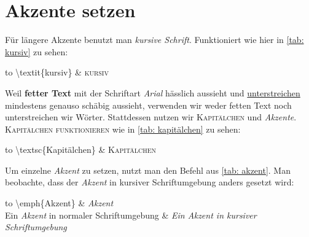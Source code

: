 \section{Akzente setzen}
Für längere Akzente benutzt man \textit{kursive Schrift}. Funktioniert wie hier in \ref{tab: kursiv} zu sehen:\\
\begin{table}[h]
\begin{tabu} to \textwidth {X[l]X[l]}
\toprule
\textbackslash textit\{kursiv\} & \textsc{kursiv} \\
\bottomrule
\end{tabu}
\caption{kursiv}
\label{tab: kursiv}
\end{table}
%
%
Weil \textbf{fetter Text} mit der Schriftart \emph{Arial} hässlich aussieht und \underline{unterstreichen} mindestens genauso schäbig aussieht, verwenden wir weder fetten Text noch unterstreichen wir Wörter. Stattdessen nutzen wir \textsc{Kapitälchen} und \emph{Akzente}. \textsc{Kapitälchen funktionieren} wie in \ref{tab: kapitälchen} zu sehen:\\
\begin{table}[h]
\begin{tabu} to \textwidth {X[l]X[l]}
\toprule
\textbackslash textsc\{Kapitälchen\} & \textsc{Kapitälchen} \\
\bottomrule
\end{tabu}
\caption{Kapitälchen}
\label{tab: kapitälchen}
\end{table}
%
%
Um einzelne \emph{Akzent} zu setzen, nutzt man den Befehl aus \ref{tab: akzent}. Man beobachte, dass der \emph{Akzent} in kursiver Schriftumgebung anders gesetzt wird:
\begin{table}[h]
\begin{tabu} to \textwidth {X[l]X[l]}
\toprule
\textbackslash emph\{Akzent\} & \emph{Akzent} \\
Ein \emph{Akzent} in normaler Schriftumgebung & \textit{Ein \emph{Akzent} in kursiver Schriftumgebung}\\
\bottomrule
\end{tabu}
\caption{Akzent}
\label{tab: akzent}
\end{table}
%
%